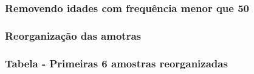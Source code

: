 \documentclass[]{article}
\newenvironment{Shaded}{\begin{snugshade}}{\end{snugshade}}
\newcommand{\CommentTok}[1]{\textcolor[rgb]{0.56,0.35,0.01}{\textit{#1}}}
\newcommand{\DataTypeTok}[1]{\textcolor[rgb]{0.13,0.29,0.53}{#1}}
\newcommand{\DecValTok}[1]{\textcolor[rgb]{0.00,0.00,0.81}{#1}}
\newcommand{\KeywordTok}[1]{\textcolor[rgb]{0.13,0.29,0.53}{\textbf{#1}}}
\newcommand{\NormalTok}[1]{#1}
\newcommand{\OperatorTok}[1]{\textcolor[rgb]{0.81,0.36,0.00}{\textbf{#1}}}
\newcommand{\StringTok}[1]{\textcolor[rgb]{0.31,0.60,0.02}{#1}}
\begin{document}
\hypertarget{removendo-idades-com-frequuxeancia-menor-que-50}{%
\subsubsection{Removendo idades com frequência menor que
50}\label{removendo-idades-com-frequuxeancia-menor-que-50}}

\label{show-remove-ages-lower-50}

\begin{Shaded}
\end{Shaded}

\hypertarget{reorganizauxe7uxe3o-das-amotras}{%
\subsubsection{Reorganização das
amotras}\label{reorganizauxe7uxe3o-das-amotras}}

\label{show-reorganizing-dat}

\begin{Shaded}
\end{Shaded}

\hypertarget{tabela---primeiras-6-amostras-reorganizadas}{%
\subsubsection{Tabela - Primeiras 6 amostras
reorganizadas}\label{tabela---primeiras-6-amostras-reorganizadas}}
\end{document}
